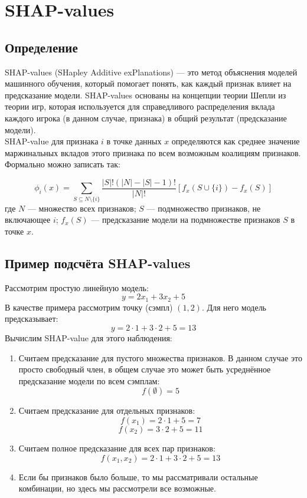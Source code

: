 \section*{SHAP-values}
\subsection*{Определение}
SHAP-values (SHapley Additive exPlanations) — это метод объяснения моделей машинного обучения, который помогает понять, как каждый признак влияет на предсказание модели.
SHAP-values основаны на концепции теории Шепли из теории игр, которая используется для справедливого распределения вклада каждого игрока (в данном случае, признака) в общий результат (предсказание модели).\\
SHAP-value для признака $i$ в точке данных $x$ определяются как среднее значение маржинальных вкладов этого признака по всем возможным коалициям признаков. Формально можно записать так:

\[ \phi_i(x) = \sum_{S \subseteq N \setminus \{i\}} \frac{|S|!(|N|-|S|-1)!}{|N|!} [f_x(S \cup \{i\}) - f_x(S)] \]
где $N$ — множество всех признаков; $S$ — подмножество признаков, не включающее $i$; $f_x(S)$ — предсказание модели на подмножестве признаков $S$ в точке $x$.

\subsection*{Пример подсчёта SHAP-values}
Рассмотрим простую линейную модель:
$$ y = 2x_1 + 3x_2 + 5 $$
В качестве примера рассмотрим точку (сэмпл) $(1, 2)$. Для него модель предсказывает:
$$ y = 2 \cdot 1 + 3 \cdot 2 + 5 = 13 $$
Вычислим SHAP-value для этого наблюдения:
\begin{enumerate}
    \item Считаем предсказание для пустого множества признаков. В данном случае это просто свободный член, в общем случае это может быть усреднённое предсказание модели по всем сэмплам:
          $$ f(\emptyset) = 5 $$

    \item Считаем предсказание для отдельных признаков:
          $$ f(x_1) = 2 \cdot 1 + 5 = 7 $$
          $$ f(x_2) = 3 \cdot 2 + 5 = 11 $$

    \item Считаем полное предсказание для всех пар признаков:
          $$ f(x_1, x_2) = 2 \cdot 1 + 3 \cdot 2 + 5 = 13 $$

    \item Если бы признаков было больше, то мы рассматривали остальные комбинации, но здесь мы рассмотрели все возможные.
\end{enumerate}

